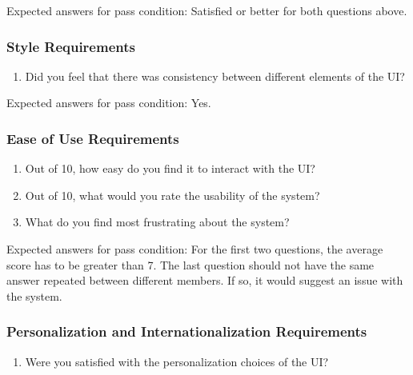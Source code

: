\documentclass[12pt, titlepage]{article}
\begin{document}
\noindent Expected answers for pass condition: Satisfied or better for both questions above.


\subsubsection{Style Requirements}

\begin{enumerate}
\item{Did you feel that there was consistency between different elements of the UI?\\}

\end{enumerate}

\noindent Expected answers for pass condition: Yes.


\subsubsection{Ease of Use Requirements}

\begin{enumerate}
\item{Out of 10, how easy do you find it to interact with the UI?\\}
\item{Out of 10, what would you rate the usability of the system?\\}
\item{What do you find most frustrating about the system?\\}

\end{enumerate}

\noindent Expected answers for pass condition: For the first two questions, the average score has to be greater than 7. The last question should not have the same answer repeated between different members. If so, it would suggest an issue with the system. 


\subsubsection{Personalization and Internationalization Requirements}

\begin{enumerate}
\item{Were you satisfied with the personalization choices of the UI?\\}

\end{enumerate}
\end{document}
